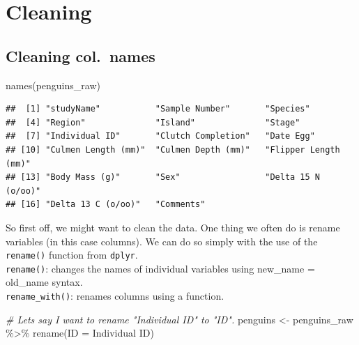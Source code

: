 \documentclass[
]{book}
\newenvironment{Shaded}{\begin{snugshade}}{\end{snugshade}}
\newcommand{\CommentTok}[1]{\textcolor[rgb]{0.56,0.35,0.01}{\textit{#1}}}
\newcommand{\FunctionTok}[1]{\textcolor[rgb]{0.00,0.00,0.00}{#1}}
\newcommand{\NormalTok}[1]{#1}
\newcommand{\OtherTok}[1]{\textcolor[rgb]{0.56,0.35,0.01}{#1}}
\newcommand{\SpecialCharTok}[1]{\textcolor[rgb]{0.00,0.00,0.00}{#1}}
\newcommand{\StringTok}[1]{\textcolor[rgb]{0.31,0.60,0.02}{#1}}
\begin{document}
\hypertarget{cleaning}{%
\section{Cleaning}\label{cleaning}}

\hypertarget{cleaning-col.-names}{%
\subsection{Cleaning col.~names}\label{cleaning-col.-names}}

\begin{Shaded}
\begin{Highlighting}[]
\FunctionTok{names}\NormalTok{(penguins\_raw)}
\end{Highlighting}
\end{Shaded}

\begin{verbatim}
##  [1] "studyName"           "Sample Number"       "Species"            
##  [4] "Region"              "Island"              "Stage"              
##  [7] "Individual ID"       "Clutch Completion"   "Date Egg"           
## [10] "Culmen Length (mm)"  "Culmen Depth (mm)"   "Flipper Length (mm)"
## [13] "Body Mass (g)"       "Sex"                 "Delta 15 N (o/oo)"  
## [16] "Delta 13 C (o/oo)"   "Comments"
\end{verbatim}

So first off, we might want to clean the data.
One thing we often do is rename variables (in this case columns).
We can do so simply with the use of the \texttt{rename()} function from \texttt{dplyr}.\\

\texttt{rename()}: changes the names of individual variables using new\_name = old\_name syntax.\\

\texttt{rename\_with()}: renames columns using a function.

\begin{Shaded}
\begin{Highlighting}[]
\CommentTok{\# Lets say I want to rename "Individual ID" to "ID".}
\NormalTok{penguins }\OtherTok{\textless{}{-}}\NormalTok{ penguins\_raw }\SpecialCharTok{\%\textgreater{}\%} 
  \FunctionTok{rename}\NormalTok{(}\StringTok{\textquotesingle{}ID\textquotesingle{}} \OtherTok{=} \StringTok{\textquotesingle{}Individual ID\textquotesingle{}}\NormalTok{)}
\end{Highlighting}
\end{Shaded}
\end{document}
